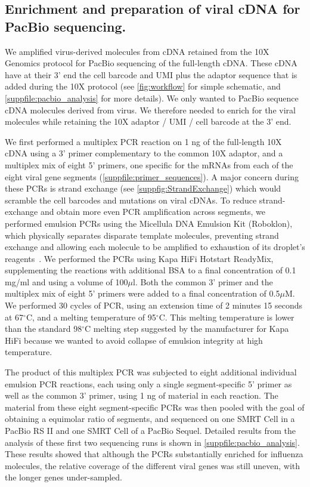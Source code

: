 \documentclass[lineno]{asm-article}
\newcommand{\FIG}[1]{\autoref{fig:#1}}
\newcommand{\SUPPFILE}[1]{\autoref{suppfile:#1}}
\newcommand{\SUPPFIG}[1]{\autoref{suppfig:#1}}
\begin{document}
\subsection{Enrichment and preparation of viral cDNA for PacBio sequencing.}
We amplified virus-derived molecules from cDNA retained from the 10X Genomics protocol for PacBio sequencing of the full-length cDNA.
These cDNA have at their 3' end the cell barcode and UMI plus the adaptor sequence that is added during the 10X protocol (see \FIG{workflow} for simple schematic, and \SUPPFILE{pacbio_analysis} for more details). 
We only wanted to PacBio sequence cDNA molecules derived from virus.
We therefore needed to enrich for the viral molecules while retaining the 10X adaptor / UMI / cell barcode at the 3' end.

We first performed a multiplex PCR reaction on 1 ng of the full-length 10X cDNA using a 3' primer complementary to the common 10X adaptor, and a multiplex mix of eight 5' primers, one specific for the mRNAs from each of the eight viral gene segments (\SUPPFILE{primer_sequences}).
A major concern during these PCRs is strand exchange (see \SUPPFIG{StrandExchange}) which would scramble the cell barcodes and mutations on viral cDNAs.
To reduce strand-exchange and obtain more even PCR amplification across segments, we performed emulsion PCRs using the Micellula DNA Emulsion Kit (Roboklon), which physically separates disparate template molecules, preventing strand exchange and allowing each molecule to be amplified to exhaustion of its droplet's reagents~\cite{boers2015micelle}.
We performed the PCRs using Kapa HiFi Hotstart ReadyMix, supplementing the reactions with additional BSA to a final concentration of 0.1 mg/ml and using a volume of 100$\mu$l.
Both the common 3' primer and the multiplex mix of eight 5' primers were added to a final concentration of 0.5$\mu$M.
We performed 30 cycles of PCR, using an extension time of 2 minutes 15 seconds at 67$^{\circ}$C, and a melting temperature of 95$^{\circ}$C.
This melting temperature is lower than the standard 98$^{\circ}$C melting step suggested by the manufacturer for Kapa HiFi because we wanted to avoid collapse of emulsion integrity at high temperature.

The product of this multiplex PCR was subjected to eight additional individual emulsion PCR reactions, each using only a single segment-specific 5' primer as well as the common 3' primer, using 1 ng of material in each reaction.
The material from these eight segment-specific PCRs was then pooled with the goal of obtaining a equimolar ratio of segments, and sequenced on one SMRT Cell in a PacBio RS II and one SMRT Cell of a PacBio Sequel. 
Detailed results from the analysis of these first two sequencing runs is shown in \SUPPFILE{pacbio_analysis}.
These results showed that although the PCRs substantially enriched for influenza molecules, the relative coverage of the different viral genes was still uneven, with the longer genes under-sampled.
\end{document}
